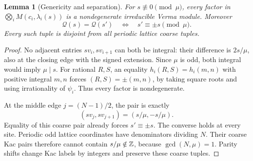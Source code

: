 \documentclass[11pt,a4paper]{article}
\numberwithin{equation}{section}
\newtheorem{lemma}[theorem]{Lemma}
\theoremstyle{definition}\newtheorem{definition}[theorem]{Definition}
\theoremstyle{remark}\newtheorem{remark}[theorem]{Remark}
\begin{document}
\begin{lemma}[Genericity and separation]\label{g:lem:arithmetic}
For $s\not\equiv0\pmod\mu$, every factor in
$\bigotimes_i M(c_i,\lambda_i(s))$ is a nondegenerate irreducible
Verma module. Moreover
\[
 \mathcal Q(s)=\mathcal Q(s')
       \quad\Longleftrightarrow\quad s'\equiv\pm s\pmod\mu.
\]
Every such tuple is disjoint from all periodic lattice coarse tuples.
\end{lemma}
\begin{proof}
No adjacent entries $sv_i,sv_{i+1}$ can both be integral: their
difference is $2s/\mu$, also at the closing edge with the signed
extension. Since $\mu$ is odd, both integral would imply $\mu\mid s$.
For rational $R,S$, an equality
$h_i(R,S)=h_i(m,n)$ with positive integral $m,n$ forces
$(R,S)=\pm(m,n)$, by taking square roots and using irrationality of
$\psi_i$. Thus every factor is nondegenerate.

At the middle edge $j=(N-1)/2$, the pair is exactly
\[
       (sv_j,sv_{j+1})=(s/\mu,-s/\mu).
\]
Equality of this coarse pair already forces $s'\equiv\pm s$.
The converse holds at every site.
Periodic odd lattice coordinates have denominators dividing $N$.
Their coarse Kac pairs therefore cannot contain $s/\mu\notin\mathbb Z$,
because $\gcd(N,\mu)=1$. Parity shifts change Kac labels by integers
and preserve these coarse tuples.
\end{proof}
\end{document}
